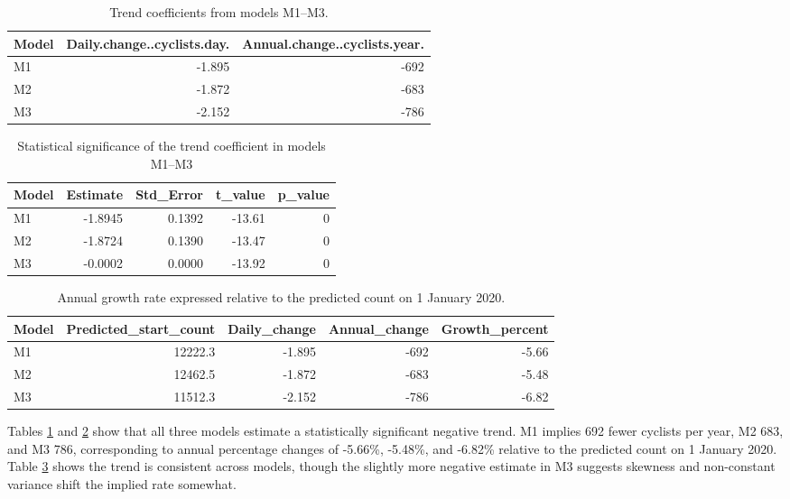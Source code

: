\documentclass[
]{article}
\begin{document}
\begin{table}[!h]
\centering
\caption{\label{tab:tab-trendcoefs}Trend coefficients from models M1--M3.}
\centering
\begin{tabular}[t]{lrr}
\toprule
Model & Daily.change..cyclists.day. & Annual.change..cyclists.year.\\
\midrule
M1 & -1.895 & -692\\
M2 & -1.872 & -683\\
M3 & -2.152 & -786\\
\bottomrule
\end{tabular}
\end{table}

\begin{table}[!h]
\centering
\caption{\label{tab:tab-trendsig}Statistical significance of the trend coefficient in models M1--M3}
\centering
\begin{tabular}[t]{lrrrr}
\toprule
Model & Estimate & Std\_Error & t\_value & p\_value\\
\midrule
M1 & -1.8945 & 0.1392 & -13.61 & 0\\
M2 & -1.8724 & 0.1390 & -13.47 & 0\\
M3 & -0.0002 & 0.0000 & -13.92 & 0\\
\bottomrule
\end{tabular}
\end{table}

\begin{table}[!h]
\centering
\caption{\label{tab:tab-growthrate}Annual growth rate expressed relative to the predicted count on 1 January 2020.}
\centering
\begin{tabular}[t]{lrrrr}
\toprule
Model & Predicted\_start\_count & Daily\_change & Annual\_change & Growth\_percent\\
\midrule
M1 & 12222.3 & -1.895 & -692 & -5.66\\
M2 & 12462.5 & -1.872 & -683 & -5.48\\
M3 & 11512.3 & -2.152 & -786 & -6.82\\
\bottomrule
\end{tabular}
\end{table}

Tables \ref{tab:tab-trendcoefs} and \ref{tab:tab-trendsig} show that all three models estimate a statistically significant negative trend.
M1 implies 692 fewer cyclists per year, M2 683, and M3 786, corresponding to annual percentage changes of -5.66\%, -5.48\%, and -6.82\% relative to the predicted count on 1 January 2020. Table \ref{tab:tab-growthrate} shows the trend is consistent across models, though the slightly more
negative estimate in M3 suggests skewness and non-constant variance shift the implied rate somewhat.
\end{document}
